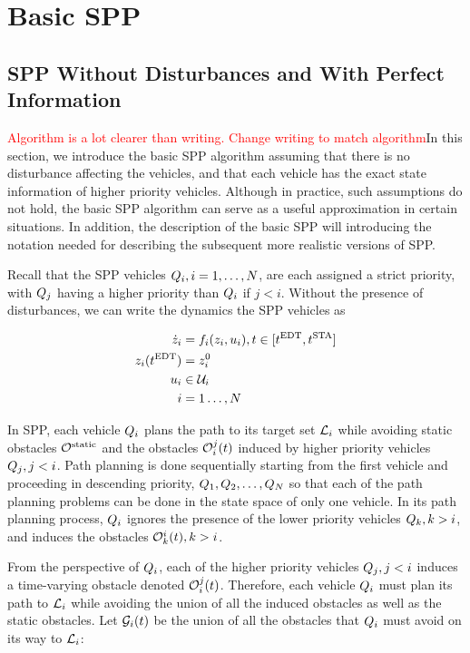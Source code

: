 \section{Basic SPP\label{sec:basic}}
\subsection{SPP Without Disturbances and With Perfect Information}
\textcolor{red}{Algorithm is a lot clearer than writing. Change writing to match algorithm}In this section, we introduce the basic SPP algorithm assuming that there is no disturbance affecting the vehicles, and that each vehicle has the exact state information of higher priority vehicles. Although in practice, such assumptions do not hold, the basic SPP algorithm can serve as a useful approximation in certain situations. In addition, the description of the basic SPP will introducing the notation needed for describing the subsequent more realistic versions of SPP. 

Recall that the SPP vehicles $Q_{i}, i=1,\ldots,N$, are each assigned a strict priority, with $Q_{j}$ having a higher priority than $Q_{i}$ if $j<i$. Without the presence of disturbances, we can write the dynamics the SPP vehicles as

\begin{equation}
\begin{aligned}
\dot{z}_i &= f_i(z_i, u_i), t \in [t^\text{EDT}, t^\text{STA}] \\
z_i(t^\text{EDT}) &= z^0_i \\
u_i &\in \mathcal{U}_i \\
i &= 1 \ldots, N
\end{aligned}
\end{equation}

In SPP, each vehicle $Q_{i}$ plans the path to its target set $\mathcal{L}_i$ while avoiding static obstacles $\mathcal{O}^\text{static}$ and the obstacles $\mathcal{O}_i^j(t)$ induced by higher priority vehicles $Q_{j}, j<i$. Path planning is done sequentially starting from the first vehicle and proceeding in descending priority, $Q_{1}, Q_{2}, \ldots, Q_{N}$ so that each of the path planning problems can be done in the state space of only one vehicle. In its path planning process, $Q_{i}$ ignores the presence of the lower priority vehicles $Q_{k}, k>i$, and induces the obstacles $\mathcal{O}_k^i(t), k>i$.

From the perspective of $Q_{i}$, each of the higher priority vehicles $Q_{j}, j<i$ induces a time-varying obstacle denoted $\mathcal{O}_i^j(t)$. Therefore, each vehicle $Q_{i}$ must plan its path to $\mathcal{L}_i$ while avoiding the union of all the induced obstacles as well as the static obstacles. Let $\mathcal{G}_i(t)$ be the union of all the obstacles that $Q_{i}$ must avoid on its way to $\mathcal{L}_i$:


